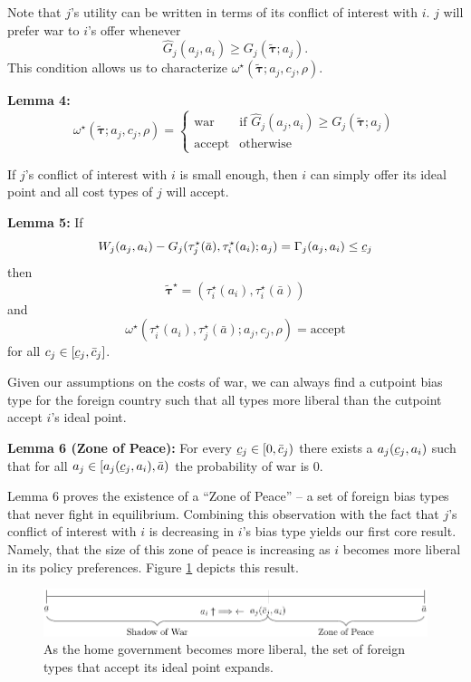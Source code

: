 \documentclass{puthesis}
\DeclareRobustCommand{\ubar}[1]{\underaccent{\bar}{#1}}
\begin{document}
Note that \(j\)'s utility can be written in terms of its conflict of
interest with \(i\). \(j\) will prefer war to \(i\)'s offer whenever \[
\hat{G}_j(a_j, a_i) \geq G_j(\tilde{\bm{\tau}}; a_j) .
\] This condition allows us to characterize
\(\omega^\star(\tilde{\bm{\tau}}; a_j, c_j, \rho)\).

\textbf{Lemma 4:} \[
\omega^\star(\tilde{\bm{\tau}}; a_j, c_j, \rho) = \begin{cases}
\text{war} & \text{if } \hat{G}_j(a_j, a_i) \geq G_j(\tilde{\bm{\tau}}; a_j) \\
\text{accept} & \text{otherwise}
\end{cases}
\]

If \(j\)'s conflict of interest with \(i\) is small enough, then \(i\)
can simply offer its ideal point and all cost types of \(j\) will
accept.

\textbf{Lemma 5:} If \[
W_j(a_j, a_i) - G_j(\tau_j^\star(\bar{a}), \tau_i^\star(a_i); a_j) = \Gamma_j(a_j, a_i) \leq \ubar{c}_j
\] then \[
\tilde{\bm{\tau}}^\star = \left( \tau_i^\star(a_i), \tau_i^\star(\bar{a}) \right)
\] and \[
\omega^\star(\tau_i^\star(a_i), \tau_j^\star(\bar{a}); a_j, c_j, \rho) = \text{accept}
\] for all \(c_j \in [\ubar{c}_j, \bar{c}_j]\).

Given our assumptions on the costs of war, we can always find a cutpoint
bias type for the foreign country such that all types more liberal than
the cutpoint accept \(i\)'s ideal point.

\textbf{Lemma 6 (Zone of Peace):} For every
\(\ubar{c}_j \in [ 0, \bar{c}_j )\) there exists a
\(a_j(\ubar{c}_j, a_i)\) such that for all
\(a_j \in [ a_j(\ubar{c}_j, a_i), \bar{a} )\) the probability of war is
0.

Lemma 6 proves the existence of a ``Zone of Peace'' -- a set of foreign
bias types that never fight in equilibrium. Combining this observation
with the fact that \(j\)'s conflict of interest with \(i\) is decreasing
in \(i\)'s bias type yields our first core result. Namely, that the size
of this zone of peace is increasing as \(i\) becomes more liberal in its
policy preferences. Figure \ref{fig:zop} depicts this result.

\begin{figure}
\centering
\includegraphics{figure/aLine.pdf}
\caption{As the home government becomes more liberal, the set of foreign
types that accept its ideal point expands. \label{fig:zop}}
\end{figure}
\end{document}
